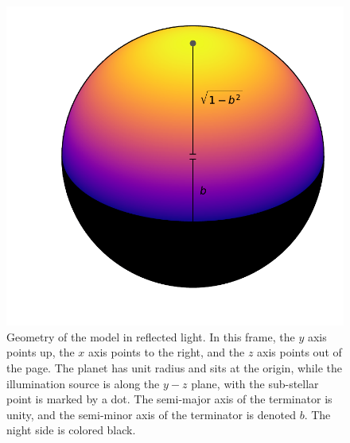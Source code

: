 \documentclass[modern]{aastex62}
\begin{document}
\begin{figure}[t!]
    \begin{centering}
    \includegraphics[width=0.4\linewidth]{figures/geometry.pdf}
    \caption{\label{fig:geometry}
             Geometry of the \starry model in reflected light. In this frame, 
             the $y$ axis points up, 
             the $x$ axis points to the right, and the $z$ axis points out of the page.
             The planet has unit radius and sits at the origin, while
             the illumination source is along the $y-z$ plane, with the sub-stellar point is
             marked by a dot. The semi-major axis of the terminator is unity, and
             the semi-minor axis of the terminator is denoted $b$. The night side
             is colored black.
             }
    \end{centering}
\end{figure}
\end{document}
